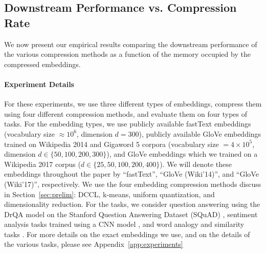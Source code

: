 \subsection{Downstream Performance vs. Compression Rate}
\label{sec:perf_comp}

We now present our empirical results comparing the downstream performance of the various compression methods as a function of the memory occupied by the compressed embeddings.

\paragraph{Experiment Details}
For these experiments, we use three different types of embeddings,
compress them using four different compression methods,
and evaluate them on four types of tasks.
For the embedding types, we use publicly available fastText embeddings (vocabulary size $\approx 10^6$, dimension $d=300$), publicly available GloVe embeddings trained on Wikipedia 2014 and Gigaword 5 corpora (vocabulary size $= 4\times 10^5$, dimension $d \in \{50,100,200,300\}$), and GloVe embeddings which we trained on a Wikipedia 2017 corpus ($d \in \{25,50,100,200,400\}$).
We will denote these embeddings throughout the paper by ``fastText'', ``GloVe (Wiki'14)'', and ``GloVe (Wiki'17)'', respectively.
We use the four embedding compression methods discuss in Section~\ref{sec:prelim}: DCCL, k-means, uniform quantization, and dimensionality reduction.
For the tasks, we consider question answering using the DrQA model \citep{drqa17} on the Stanford Question Answering Dataset (SQuAD) \citep{squad16}, sentiment analysis tasks trained using a CNN model \citep{kim14}, and word analogy and similarity tasks \citep{levy15}.
For more details on the exact embeddings we use, and on the details of the various tasks, please see Appendix~\ref{app:experiments}

